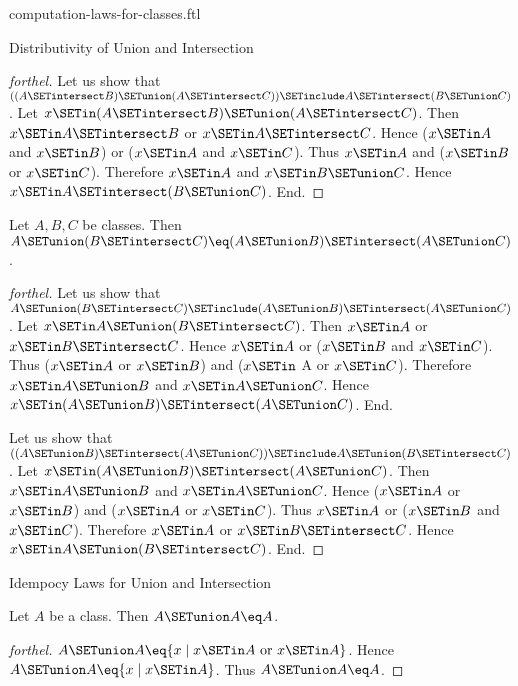 \documentclass{naproche-library}
\begin{document}
\begin{smodule}[title=Computation Laws For Classes]{computation-laws-for-classes.ftl}
\begin{sfragment}{Distributivity of Union and Intersection}
\begin{proof}[forthel]
    Let us show that $((A \SETintersect B) \SETunion (A \SETintersect C)) \SETinclude A \SETintersect (B \SETunion C)$. %
      Let $x \SETin (A \SETintersect B) \SETunion (A \SETintersect C)$.
      Then $x \SETin A \SETintersect B$ or $x \SETin A \SETintersect C$.
      Hence ($x \SETin A$ and $x \SETin B$) or ($x \SETin A$ and $x \SETin C$).
      Thus $x \SETin A$ and ($x \SETin B$ or $x \SETin C$).
      Therefore $x \SETin A$ and $x \SETin B \SETunion C$.
      Hence$ x \SETin A \SETintersect (B \SETunion C)$.
    End.
  \end{proof}

  \begin{proposition}[forthel,id=FOUNDATIONS_02_5937390721957888]
    Let $A, B, C$ be classes.
    Then $A \SETunion (B \SETintersect C) \eq (A \SETunion B) \SETintersect (A \SETunion C)$.
  \end{proposition}
  \begin{proof}[forthel]
    Let us show that $A \SETunion (B \SETintersect C) \SETinclude (A \SETunion B) \SETintersect (A \SETunion C)$.
      Let $x \SETin A \SETunion (B \SETintersect C)$.
      Then $x \SETin A$ or $x \SETin B \SETintersect C$.
      Hence $x \SETin A$ or ($x \SETin B$ and $x \SETin C$).
      Thus ($x \SETin A$ or $x \SETin B$) and ($x \SETin$ A or $x \SETin C$).
      Therefore $x \SETin A \SETunion B$ and $x \SETin A \SETunion C$.
      Hence $x \SETin (A \SETunion B) \SETintersect (A \SETunion C)$.
    End.

    Let us show that $((A \SETunion B) \SETintersect (A \SETunion C)) \SETinclude A \SETunion (B \SETintersect C)$. %
      Let $x \SETin (A \SETunion B) \SETintersect (A \SETunion C)$.
      Then $x \SETin A \SETunion B$ and $x \SETin A \SETunion C$.
      Hence ($x \SETin A$ or $x \SETin B$) and ($x \SETin A$ or $x \SETin C$).
      Thus $x \SETin A$ or ($x \SETin B$ and $x \SETin C$).
      Therefore $x \SETin A$ or $x \SETin B \SETintersect C$.
      Hence $x \SETin A \SETunion (B \SETintersect C)$.
    End.
  \end{proof}
\end{sfragment}

\begin{sfragment}{Idempocy Laws for Union and Intersection}
  \begin{proposition}[forthel,id=FOUNDATIONS_02_2096996737351680]
    Let $A$ be a class.
    Then $A \SETunion A \eq A$.
  \end{proposition}
  \begin{proof}[forthel]
    $A \SETunion A \eq \{x \mid x \SETin A\text{ or }x \SETin A \}$.
    Hence $A \SETunion A \eq \{ x \mid x \SETin A \}$.
    Thus $A \SETunion A \eq A$.
  \end{proof}


\end{sfragment}
\end{smodule}
\end{document}
